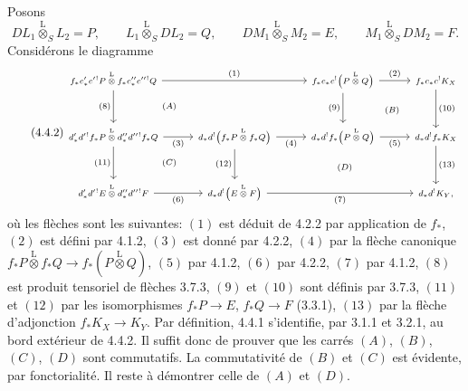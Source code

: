 \begin{prooftext}[Démonstration -]
Posons
\[
DL_1\overset{\mathrm{L}}{\otimes}_SL_2=P,\qquad
L_1\overset{\mathrm{L}}{\otimes}_SDL_2=Q,\qquad
DM_1\overset{\mathrm{L}}{\otimes}_SM_2=E,\qquad
M_1\overset{\mathrm{L}}{\otimes}_SDM_2=F.
\]
Considérons le diagramme
\begin{equation}
\tag{4.4.2}
\begin{tikzcd}[column sep=2.6em,row sep=2.6em,cells={nodes={font=\scriptsize}},every label/.append style={font=\scriptsize}]
f_*c'_*c'{}^!P\overset{\mathrm{L}}{\otimes} f_*c''_*c''{}^!Q
  \arrow[rr,"(1)"] \arrow[d,"(8)"'] &&
f_*c_*c^!\bigl(P\overset{\mathrm{L}}{\otimes}Q\bigr)
  \arrow[r,"(2)"] \arrow[d,"(9)"'] &
f_*c_*c^!K_X \arrow[d,"(10)"]\\
d'_*d'{}^!f_*P\overset{\mathrm{L}}{\otimes}d''_*d''{}^!f_*Q
  \arrow[r,"(3)"'] \arrow[d,"(11)"'] &
d_*d^!\bigl(f_*P\overset{\mathrm{L}}{\otimes}f_*Q\bigr)
  \arrow[r,"(4)"'] \arrow[d,"(12)"'] &
d_*d^!f_*\bigl(P\overset{\mathrm{L}}{\otimes}Q\bigr)
  \arrow[r,"(5)"'] &
d_*d^!f_*K_X \arrow[d,"(13)"]\\
d'_*d'{}^!E\overset{\mathrm{L}}{\otimes}d''_*d''{}^!F
  \arrow[r,"(6)"'] &
d_*d^!\bigl(E\overset{\mathrm{L}}{\otimes}F\bigr)
  \arrow[rr,"(7)"'] &&
d_*d^!K_Y,
\arrow[from=1-1,to=2-2, phantom, "\scriptstyle (A)"]
\arrow[from=1-3,to=2-4, phantom, "\scriptstyle (B)"]
\arrow[from=2-1,to=3-2, phantom, "\scriptstyle (C)"]
\arrow[from=2-2,to=3-4, phantom, "\scriptstyle (D)"]
\end{tikzcd}
\end{equation}
où les
flèches sont les suivantes: $(1)$ est déduit de 4.2.2 par application de $f_*$, $(2)$ est défini par 4.1.2, $(3)$ est donné par 4.2.2, $(4)$ par la flèche canonique $f_*P\overset{\mathrm{L}}{\otimes}f_*Q\longrightarrow f_*(P\overset{\mathrm{L}}{\otimes}Q)$, $(5)$ par 4.1.2, $(6)$ par 4.2.2, $(7)$ par 4.1.2, $(8)$ est produit tensoriel de flèches 3.7.3, $(9)$ et $(10)$ sont définis par 3.7.3, $(11)$ et $(12)$ par les isomorphismes $f_*P\longrightarrow E$, $f_*Q\longrightarrow F$ (3.3.1), $(13)$ par la flèche d'adjonction $f_*K_X\longrightarrow K_Y$. Par définition, 4.4.1 s'identifie, par 3.1.1 et 3.2.1, au bord extérieur de 4.4.2. Il suffit donc de prouver que les carrés $(A)$, $(B)$, $(C)$, $(D)$ sont commutatifs. La commutativité de $(B)$ et $(C)$ est évidente, par fonctorialité. Il reste à démontrer celle de $(A)$ et $(D)$.


\end{prooftext}
